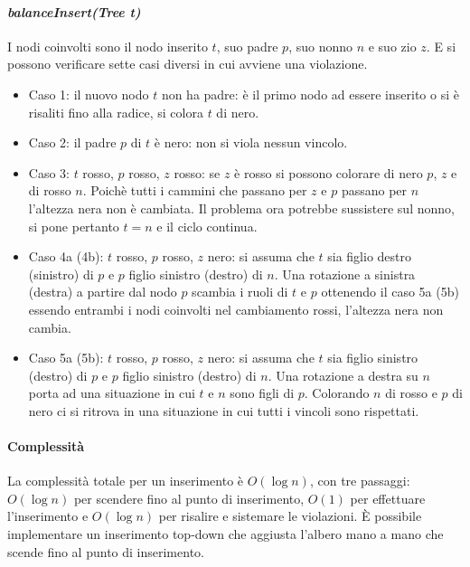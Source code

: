 \paragraph{\emph{balanceInsert(Tree t)}}
I nodi coinvolti sono il nodo inserito $t$, suo padre $p$, suo nonno $n$ e suo zio $z$. E si possono verificare sette casi diversi in cui avviene una
violazione.
\begin{multicols}{2}
    \begin{itemize}
        \item Caso 1: il nuovo nodo $t$ non ha padre: \`e il primo nodo ad essere inserito o si \`e risaliti fino alla radice, si colora $t$ di nero.
        \item Caso 2: il padre $p$ di $t$ \`e nero: non si viola nessun vincolo.
        \item Caso 3: $t$ rosso, $p$ rosso, $z$ rosso: se $z$ \`e rosso si possono colorare di nero $p$, $z$ e di rosso $n$. Poich\`e tutti i cammini che passano
              per $z$ e $p$ passano per $n$ l'altezza nera non \`e cambiata. Il problema ora potrebbe sussistere sul nonno, si pone pertanto $t=n$ e il ciclo continua.
        \item Caso 4a (4b): $t$ rosso, $p$ rosso, $z$ nero: si assuma che $t$ sia figlio destro (sinistro) di $p$ e $p$ figlio sinistro (destro) di $n$. Una
              rotazione a sinistra (destra) a partire dal nodo $p$ scambia i ruoli di $t$ e $p$ ottenendo il caso 5a (5b) essendo entrambi i nodi coinvolti nel
              cambiamento rossi, l'altezza nera non cambia.
        \item Caso 5a (5b): $t$ rosso, $p$ rosso, $z$ nero: si assuma che $t$ sia figlio sinistro (destro) di $p$ e $p$ figlio sinistro (destro) di $n$. Una
              rotazione a destra su $n$ porta ad una situazione in cui $t$ e $n$ sono figli di $p$. Colorando $n$ di rosso e $p$ di nero ci si ritrova in una situazione
              in cui tutti i vincoli sono rispettati.
    \end{itemize}
\end{multicols}

\newpage
\paragraph{Complessit\`a}
La complessit\`a totale per un inserimento \`e $O(\log n)$, con tre passaggi: $O(\log n)$ per scendere fino al punto di inserimento, $O(1)$ per effettuare
l'inserimento e $O(\log n)$ per risalire e sistemare le violazioni. \`E possibile implementare un inserimento top-down che aggiusta l'albero mano a mano
che scende fino al punto di inserimento.
